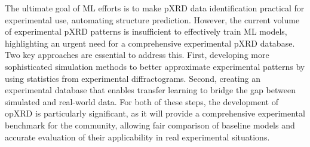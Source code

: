 The ultimate goal of ML efforts is to make pXRD data identification practical for experimental use, automating structure prediction. However, the current volume of experimental pXRD patterns is insufficient to effectively train ML models, highlighting an urgent need for a comprehensive experimental pXRD database. Two key approaches are essential to address this. First, developing more sophisticated simulation methods to better approximate experimental patterns\cite{cao2024simxrd} by using statistics from experimental diffractograms. Second, creating an experimental database that enables transfer learning to bridge the gap between simulated and real-world data. For both of these steps, the development of opXRD is particularly significant, as it will provide a comprehensive experimental benchmark for the community, allowing fair comparison of baseline models and accurate evaluation of their applicability in real experimental situations.